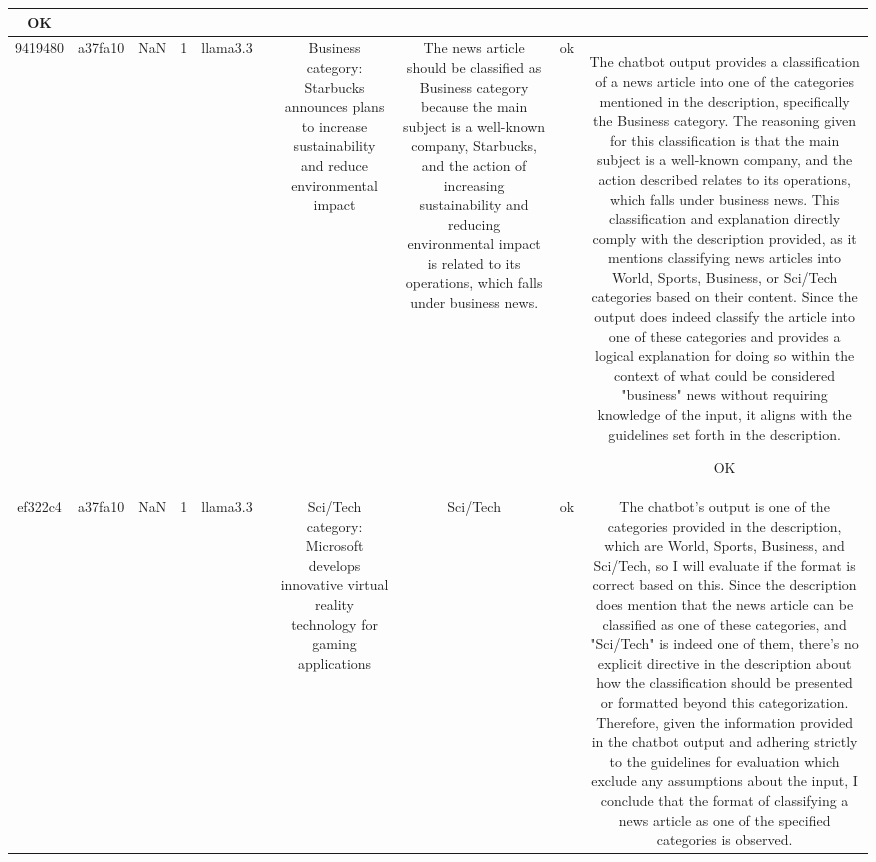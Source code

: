 \begin{table}[h!]
\begin{tabular}{|c|c|c|c|c|c|c|c|c|c|}
OK\\
\hline
9419480 & a37fa10 & NaN & 1 & llama3.3 &  & Business category: Starbucks announces plans to increase sustainability and reduce environmental impact & The news article should be classified as Business category because the main subject is a well-known company, Starbucks, and the action of increasing sustainability and reducing environmental impact is related to its operations, which falls under business news. & ok & The chatbot output provides a classification of a news article into one of the categories mentioned in the description, specifically the Business category. The reasoning given for this classification is that the main subject is a well-known company, and the action described relates to its operations, which falls under business news. This classification and explanation directly comply with the description provided, as it mentions classifying news articles into World, Sports, Business, or Sci/Tech categories based on their content. Since the output does indeed classify the article into one of these categories and provides a logical explanation for doing so within the context of what could be considered "business" news without requiring knowledge of the input, it aligns with the guidelines set forth in the description.

OK\\
\hline
ef322c4 & a37fa10 & NaN & 1 & llama3.3 &  & Sci/Tech category: Microsoft develops innovative virtual reality technology for gaming applications & Sci/Tech & ok & The chatbot's output is one of the categories provided in the description, which are World, Sports, Business, and Sci/Tech, so I will evaluate if the format is correct based on this. Since the description does mention that the news article can be classified as one of these categories, and "Sci/Tech" is indeed one of them, there's no explicit directive in the description about how the classification should be presented or formatted beyond this categorization. Therefore, given the information provided in the chatbot output and adhering strictly to the guidelines for evaluation which exclude any assumptions about the input, I conclude that the format of classifying a news article as one of the specified categories is observed.


\end{tabular}
\end{table}
